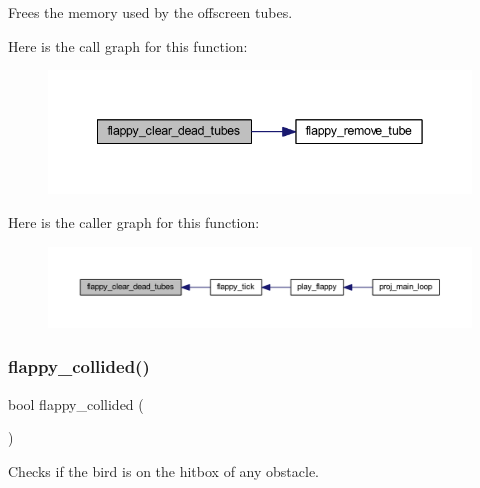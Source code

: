 Frees the memory used by the offscreen tubes. 

Here is the call graph for this function\+:\nopagebreak
\begin{figure}[H]
\begin{center}
\leavevmode
\includegraphics[width=342pt]{group__flappy_gac459c993f010cd477b1cff328d2e6ce4_cgraph}
\end{center}
\end{figure}
Here is the caller graph for this function\+:\nopagebreak
\begin{figure}[H]
\begin{center}
\leavevmode
\includegraphics[width=350pt]{group__flappy_gac459c993f010cd477b1cff328d2e6ce4_icgraph}
\end{center}
\end{figure}
\mbox{\label{group__flappy_ga2b239332f6f259b99e59203e1ae3de43}} 
\subsubsection{\texorpdfstring{flappy\+\_\+collided()}{flappy\_collided()}}
{\footnotesize\ttfamily bool flappy\+\_\+collided (\begin{DoxyParamCaption}{ }\end{DoxyParamCaption})}



Checks if the bird is on the hitbox of any obstacle. 

